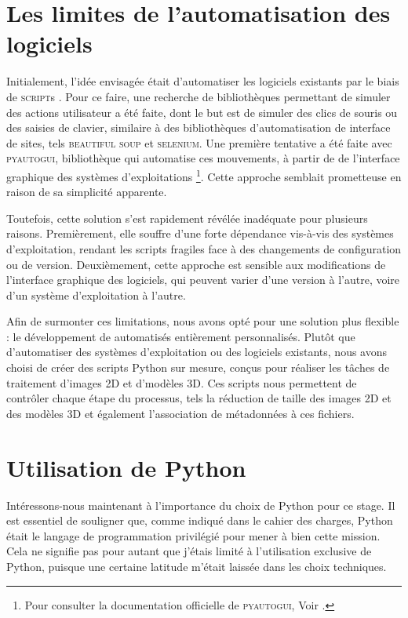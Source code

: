             
        \section{Les limites de l'automatisation des logiciels}
    
        Initialement, l'idée envisagée était d'automatiser les logiciels existants par le biais de \textsc{script}s \py. Pour ce faire, une recherche de bibliothèques permettant de simuler des actions utilisateur a été faite, dont le but est de simuler des clics de souris ou des saisies de clavier, similaire à des bibliothèques d'automatisation de interface de sites, tels \textsc{beautiful soup} et \textsc{selenium}. Une première tentative a été faite avec \textsc{pyautogui}, bibliothèque qui automatise ces mouvements, à partir de de l'interface graphique des systèmes d'exploitations \footnote{Pour consulter la documentation officielle de \textsc{pyautogui}, Voir \cite{pyautogui}.}. Cette approche semblait prometteuse en raison de sa simplicité apparente.

        Toutefois, cette solution s'est rapidement révélée inadéquate pour plusieurs raisons. Premièrement, elle souffre d'une forte dépendance vis-à-vis des systèmes d'exploitation, rendant les scripts fragiles face à des changements de configuration ou de version. Deuxièmement, cette approche est sensible aux modifications de l'interface graphique des logiciels, qui peuvent varier d'une version à l'autre, voire d'un système d'exploitation à l'autre.

        Afin de surmonter ces limitations, nous avons opté pour une solution plus flexible : le développement de  automatisés entièrement personnalisés. Plutôt que d'automatiser des systèmes d'exploitation ou des logiciels existants, nous avons choisi de créer des scripts Python sur mesure, conçus pour réaliser les tâches de traitement d'images 2D et d'modèles 3D. Ces scripts nous permettent de contrôler chaque étape du processus, tels la réduction de taille des images 2D et des modèles 3D et également l'association de métadonnées à ces fichiers.
        
        \section{Utilisation de Python}
        
        Intéressons-nous maintenant à l'importance du choix de Python pour ce stage. Il est essentiel de souligner que, comme indiqué dans le cahier des charges, Python était le langage de programmation privilégié pour mener à bien cette mission. Cela ne signifie pas pour autant que j'étais limité à l'utilisation exclusive de Python, puisque une certaine latitude m'était laissée dans les choix techniques.

